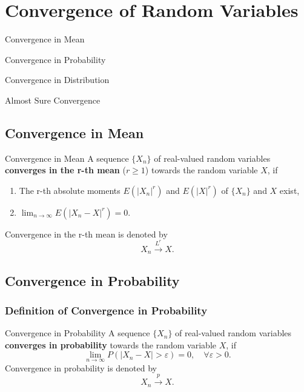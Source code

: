 \chapter{Convergence of Random Variables}

\begin{introduction}
    \item Convergence in Mean
    \item Convergence in Probability
    \item Convergence in Distribution
    \item Almost Sure Convergence
\end{introduction}

\section{Convergence in Mean}

\begin{definition}{Convergence in Mean}{}
    A sequence $\{X_n\}$ of real-valued random variables \textbf{converges in the r-th mean} ($r\geq1$) towards the random variable $X$, if
    \begin{enumerate}
        \item The r-th absolute moments $E(|X_n|^r)$ and $E(|X|^r)$ of $\{X_n\}$ and $X$ exist,
        \item $\lim_{n\to\infty}E\left(|X_n-X|^r\right)=0$.
    \end{enumerate}
    Convergence in the r-th mean is denoted by
    \begin{equation}
        X_n \stackrel{L^r}{\rightarrow} X.
    \end{equation}
\end{definition}

\section{Convergence in Probability}

\subsection{Definition of Convergence in Probability}

\begin{definition}{Convergence in Probability}{}
    A sequence $\{X_n\}$ of real-valued random variables \textbf{converges in probability} towards the random variable $X$, if
    \begin{equation}
        \lim_{n\to\infty}P\left(|X_n-X|>\varepsilon\right)=0,\quad\forall\varepsilon>0.
    \end{equation}
    Convergence in probability is denoted by
    \begin{equation}
        X_n \stackrel{p}{\rightarrow} X.
    \end{equation}
\end{definition}

